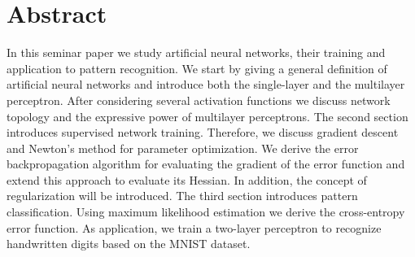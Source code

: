 \section{Abstract}

In this seminar paper we study artificial neural networks, their training and application to pattern recognition. We start by giving a general definition of artificial neural networks and introduce both the single-layer and the multilayer perceptron. After considering several activation functions we discuss network topology and the expressive power of multilayer perceptrons. The second section introduces supervised network training. Therefore, we discuss gradient descent and Newton's method for parameter optimization. We derive the error backpropagation algorithm for evaluating the gradient of the error function and extend this approach to evaluate its Hessian. In addition, the concept of regularization will be introduced. The third section introduces pattern classification. Using maximum likelihood estimation we derive the cross-entropy error function. As application, we train a two-layer perceptron to recognize handwritten digits based on the MNIST dataset.
